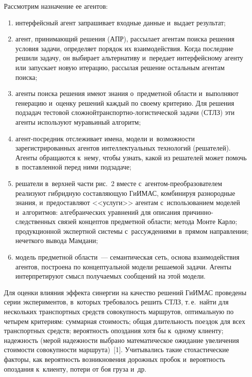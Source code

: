 \begin{multicols}{2}
  Рассмотрим назначение ее агентов: 
  \begin{enumerate}[(1)]
  \item интерфейсный агент запрашивает входные данные и~выдает результат; 
  \item агент, принимающий решения (АПР), рассылает агентам поиска 
решения условия задачи, определяет порядок их взаимодействия. Когда 
последние решили задачу, он выбирает альтернативу и~передает 
интерфейсному агенту или запускает новую итерацию, рассылая решение 
остальным агентам поиска;
  \item агенты поиска решения имеют знания о~предметной области 
и~выполняют генерацию и~оценку решений каждый по своему крите\-рию. Для 
решения подзадач тестовой сложной\linebreak транс\-порт\-но-ло\-ги\-сти\-че\-ской 
задачи (СТЛЗ) эти агенты используют муравьиный алгоритм;
  \item агент-посредник отслеживает имена, модели и~возможности 
зарегистрированных агентов интеллектуальных технологий (решателей). 
Агенты обращаются к~нему, чтобы узнать, какой из решателей может помочь 
в~по\-став\-лен\-ной перед ними подзадаче;
  \item решатели в~верхней части рис.~2 вместе 
  с~аген\-том-пре\-об\-ра\-зо\-ва\-те\-лем реализуют гибридную составляющую 
ГиИМАС, комбинируя разнородные знания, и~предоставляют <<услуги>> 
агентам с~использованием моделей и~алгоритмов: алгебраических уравнений 
для описания при\-чин\-но-след\-ст\-вен\-ных связей концептов предметной 
об\-ласти; метода Монте Карло; продукционной экспертной системы 
с~рас\-суж\-де\-ни\-ями в~прямом направлении; нечеткого вывода Мамдани;
  \item модель предметной области~--- семантическая сеть, основа 
взаимодействия агентов, построена по концептуальной модели решаемой 
задачи. Агенты интерпретируют смысл по\-лу\-ча\-емых сообщений на этой модели. 
  \end{enumerate}
  
  Для оценки влияния эффекта синергии на качество решений ГиИМАС 
проведены серии экспериментов, в~которых требовалось решить СТЛЗ, т.\,е.\ 
найти для нескольких транспортных средств совокупность маршрутов, 
оптимальную по четырем критериям: суммарная стоимость; общая 
длительность поездок для всех транспортных средств; вероятность опоздания 
хотя бы к~одному клиенту; надежность (мерой надежности выбрано 
математическое ожидание увеличения стоимости совокупности маршрута)~[1]. 
Учитывались такие стохастические факторы, как вероятность возникновения 
дорожных пробок и~вероятность опоздания к~клиенту, потери от боя груза 
и~др.
  

\end{multicols}
